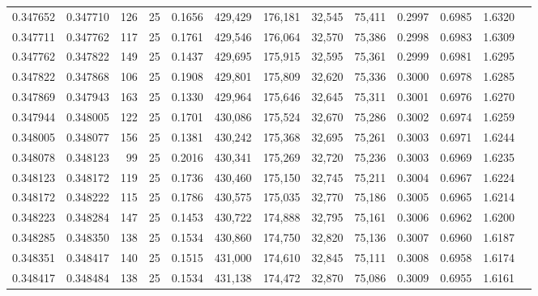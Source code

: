 \begin{tabular}{rrrrrrrrrrrrr}
0.347652 & 0.347710 &   126 &  25 &                                     0.1656 & 429,429 & 176,181 &  32,545 &  75,411 & 0.2997 & 0.6985 & 1.6320 \\
0.347711 & 0.347762 &   117 &  25 &                                     0.1761 & 429,546 & 176,064 &  32,570 &  75,386 & 0.2998 & 0.6983 & 1.6309 \\
0.347762 & 0.347822 &   149 &  25 &                                     0.1437 & 429,695 & 175,915 &  32,595 &  75,361 & 0.2999 & 0.6981 & 1.6295 \\
0.347822 & 0.347868 &   106 &  25 &                                     0.1908 & 429,801 & 175,809 &  32,620 &  75,336 & 0.3000 & 0.6978 & 1.6285 \\
0.347869 & 0.347943 &   163 &  25 &                                     0.1330 & 429,964 & 175,646 &  32,645 &  75,311 & 0.3001 & 0.6976 & 1.6270 \\
0.347944 & 0.348005 &   122 &  25 &                                     0.1701 & 430,086 & 175,524 &  32,670 &  75,286 & 0.3002 & 0.6974 & 1.6259 \\
0.348005 & 0.348077 &   156 &  25 &                                     0.1381 & 430,242 & 175,368 &  32,695 &  75,261 & 0.3003 & 0.6971 & 1.6244 \\
0.348078 & 0.348123 &    99 &  25 &                                     0.2016 & 430,341 & 175,269 &  32,720 &  75,236 & 0.3003 & 0.6969 & 1.6235 \\
0.348123 & 0.348172 &   119 &  25 &                                     0.1736 & 430,460 & 175,150 &  32,745 &  75,211 & 0.3004 & 0.6967 & 1.6224 \\
0.348172 & 0.348222 &   115 &  25 &                                     0.1786 & 430,575 & 175,035 &  32,770 &  75,186 & 0.3005 & 0.6965 & 1.6214 \\
0.348223 & 0.348284 &   147 &  25 &                                     0.1453 & 430,722 & 174,888 &  32,795 &  75,161 & 0.3006 & 0.6962 & 1.6200 \\
0.348285 & 0.348350 &   138 &  25 &                                     0.1534 & 430,860 & 174,750 &  32,820 &  75,136 & 0.3007 & 0.6960 & 1.6187 \\
0.348351 & 0.348417 &   140 &  25 &                                     0.1515 & 431,000 & 174,610 &  32,845 &  75,111 & 0.3008 & 0.6958 & 1.6174 \\
0.348417 & 0.348484 &   138 &  25 &                                     0.1534 & 431,138 & 174,472 &  32,870 &  75,086 & 0.3009 & 0.6955 & 1.6161 \\

\end{tabular}
